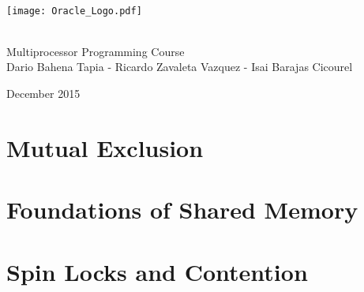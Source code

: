 \documentclass[letter,12pt]{report}
\begin{document}
\begin{titlepage}
\begin{center}

~\\[4 cm]

\texttt{[image: Oracle\_Logo.pdf]}

~\\[0.5 cm]

{\LARGE Multiprocessor Programming Course} \\[0.2 cm]

{Dario Bahena Tapia - Ricardo Zavaleta Vazquez - Isai Barajas Cicourel}

{\small December 2015}

\end{center}
\end{titlepage}

\tableofcontents

\chapter{Mutual Exclusion}




\chapter{Foundations of Shared Memory}







\chapter{Spin Locks and Contention}








\end{document}
